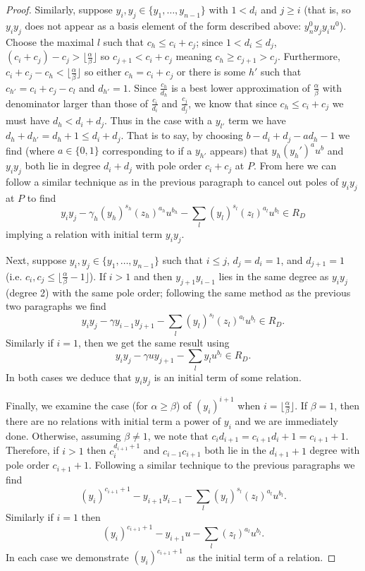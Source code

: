 \documentclass{amsart}
\theoremstyle{plain}
\theoremstyle{definition}
\theoremstyle{remark}
\numberwithin{equation}{section}
\begin{document}
\begin{proof}
Similarly, suppose $y_i,y_j\in \{y_1, \ldots ,y_{n-1}\}$ with $1<d_i$ and $j\ge i$ (that is, so 
$y_iy_j$ does not appear as a basis element of the form described above: $y_n^0 y_jy_i 
u^0$).  Choose the maximal $l$ such that $c_h\le c_i+c_j$; since $1<d_i\le d_j$, $(c_i
+c_j)-c_j>\lfloor \frac{\alpha}{\beta}\rfloor$ so $c_{j+1} < c_i + c_j$ meaning $c_h \ge c_{j
+1} > c_j$.  Furthermore, $c_i + c_j - c_h<\lfloor \frac{\alpha}{\beta} \rfloor$ so either 
$c_h=c_i+c_j$ or there is some $h'$ such that $c_{h'}=c_i+c_j-c_l$ and $d_{h'}=1$.  Since 
$\frac{c_h}{d_h}$ is a best lower approximation of $\frac{\alpha}{\beta}$ with denominator 
larger than those of $\frac{c_i}{d_i}$ and $\frac{c_j}{d_j}$, we know that since $c_h\le c_i
+c_j$ we must have $d_h<d_i+d_j$.  Thus in the case with a $y_{l'}$ term we have $d_h + 
d_{h'} = d_h + 1 \le d_i + d_j$.  That is to say, by choosing $b-d_i+d_j-ad_h-1$ we find 
(where $a\in\{0,1\}$ corresponding to if a $y_{h'}$ appears) that $y_h(y_h')^au^b$ and 
$y_iy_j$ both lie in degree $d_i+d_j$ with pole order $c_i+c_j$ at $P$.  From here we can 
follow a similar technique as in the previous paragraph to cancel out poles of $y_iy_j$ at $P
$ to find
\[
	y_iy_j-\gamma_h (y_h)^{s_h}(z_{h})^{a_h}u^{b_h}-\sum_l (y_l)^{s_l} (z_{l})^{a_l}
u^{b_l}\in R_D
\]
implying a relation with initial term $y_i y_j$.  

Next, suppose $y_i, y_j\in \{y_1, \ldots ,y_{n-1}\}$ such that $i\le j$, $d_j=d_i=1$, and $d_{j
+1}=1$ (i.e. $c_i, c_j \le \lfloor \frac{\alpha}{\beta} - 1 \rfloor$).  If $i>1$ and then $y_{j+1}
y_{i-1}$ lies in the same degree as $y_iy_j$ (degree 2) with the same pole order; following 
the same method as the previous two paragraphs we find
\[
	y_i y_j - \gamma y_{i-1} y_{j+1} - \sum_{l} (y_l)^{s_l} (z_l)^{a_l}u^{b_l}\in R_D.
\]
Similarly if $i=1$, then we get the same result using
\[
	y_i y_j - \gamma u y_{j+1} - \sum_l y_l u^{b_l} \in R_D.
\]
In both cases we deduce that $y_iy_j$ is an initial term of some relation.

Finally, we examine the case (for $\alpha \ge \beta$) of $(y_i)^{i + 1}$ when $i=\lfloor 
\frac{\alpha}{\beta}\rfloor$.  If $\beta=1$, then there are no relations with initial term a 
power of $y_i$ and we are immediately done.  Otherwise, assuming $\beta\ne 1$, we note 
that $c_id_{i+1}=c_{i+1}d_i+1=c_{i+1}+1$.   Therefore, if $i>1$ then $c_i^{d_{i+1}+1}$ and $c_{i-1} c_{i+1}$ both lie in the 
$d_{i+1}+1$ degree with pole order $c_{i+1}+1$.  Following a similar technique to the 
previous paragraphs we find
\[
	(y_i)^{c_{i+1}+1} - y_{i+1} y_{i-1} - \sum_l (y_l)^{s_l}(z_l)^{a_l} u^{b_l}.
\]
Similarly if $i=1$ then
\[
	(y_i)^{c_{i+1}+1}-y_{i+1}u-\sum_l (z_l)^{a_l} u^{b_l}.
\]
In each case we demonstrate $(y_i)^{c_{i+1}+1}$ as the initial term of a relation.  


\end{proof}
\end{document}
